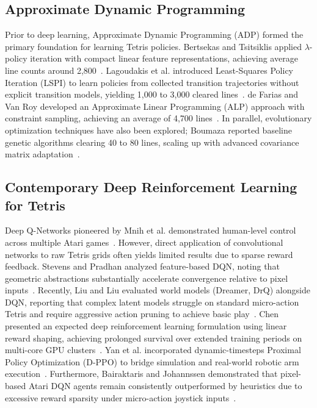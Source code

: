 \documentclass[runningheads]{llncs}
\begin{document}
\subsection{Approximate Dynamic Programming}
Prior to deep learning, Approximate Dynamic Programming (ADP) formed the primary foundation for learning Tetris policies. Bertsekas and Tsitsiklis applied $\lambda$-policy iteration with compact linear feature representations, achieving average line counts around 2,800~\cite{bertsekas1996neuro}. Lagoudakis et al. introduced Least-Squares Policy Iteration (LSPI) to learn policies from collected transition trajectories without explicit transition models, yielding 1,000 to 3,000 cleared lines~\cite{lagoudakis2002least}. de Farias and Van Roy developed an Approximate Linear Programming (ALP) approach with constraint sampling, achieving an average of 4,700 lines~\cite{farias2006tetris}. In parallel, evolutionary optimization techniques have also been explored; Boumaza reported baseline genetic algorithms clearing 40 to 80 lines, scaling up with advanced covariance matrix adaptation~\cite{boumaza2009how}.

\subsection{Contemporary Deep Reinforcement Learning for Tetris}
Deep Q-Networks pioneered by Mnih et al. demonstrated human-level control across multiple Atari games~\cite{mnih2015human}. However, direct application of convolutional networks to raw Tetris grids often yields limited results due to sparse reward feedback. Stevens and Pradhan analyzed feature-based DQN, noting that geometric abstractions substantially accelerate convergence relative to pixel inputs~\cite{stevens2016playing}. Recently, Liu and Liu evaluated world models (Dreamer, DrQ) alongside DQN, reporting that complex latent models struggle on standard micro-action Tetris and require aggressive action pruning to achieve basic play~\cite{liu2020learn}. Chen presented an expected deep reinforcement learning formulation using linear reward shaping, achieving prolonged survival over extended training periods on multi-core GPU clusters~\cite{chen2021playing}. Yan et al. incorporated dynamic-timesteps Proximal Policy Optimization (D-PPO) to bridge simulation and real-world robotic arm execution~\cite{yan2022deep}. Furthermore, Bairaktaris and Johannssen demonstrated that pixel-based Atari DQN agents remain consistently outperformed by heuristics due to excessive reward sparsity under micro-action joystick inputs~\cite{bairaktaris2025outsmarting}.
\end{document}
